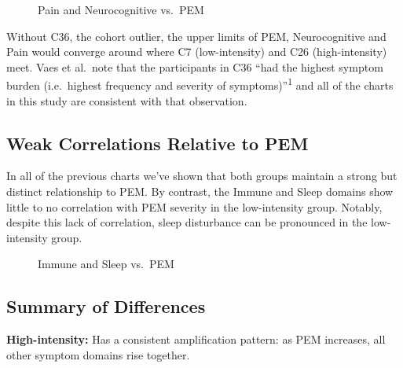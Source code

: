 \documentclass[
  letterpaper,
  DIV=11,
  numbers=noendperiod]{scrartcl}
\begin{document}
\begin{figure}[h]


\caption{\label{fig-pain}Pain and Neurocognitive vs.~PEM}

\end{figure}%

\FloatBarrier

Without C36, the cohort outlier, the upper limits of PEM, Neurocognitive
and Pain would converge around where C7 (low-intensity) and C26
(high-intensity) meet. Vaes et al.~note that the participants in C36
``had the highest symptom burden (i.e.~highest frequency and severity of
symptoms)''\textsuperscript{1} and all of the charts in this study are
consistent with that observation.

\subsection{Weak Correlations Relative to
PEM}\label{weak-correlations-relative-to-pem}

In all of the previous charts we've shown that both groups maintain a
strong but distinct relationship to PEM. By contrast, the Immune and
Sleep domains show little to no correlation with PEM severity in the
low-intensity group. Notably, despite this lack of correlation, sleep
disturbance can be pronounced in the low-intensity group.

\begin{figure}[h]


\caption{\label{fig-distinct}Immune and Sleep vs.~PEM}

\end{figure}%

\FloatBarrier

\subsection{Summary of Differences}\label{summary-of-differences}

\textbf{High-intensity:} Has a consistent amplification pattern: as PEM
increases, all other symptom domains rise together.
\end{document}
